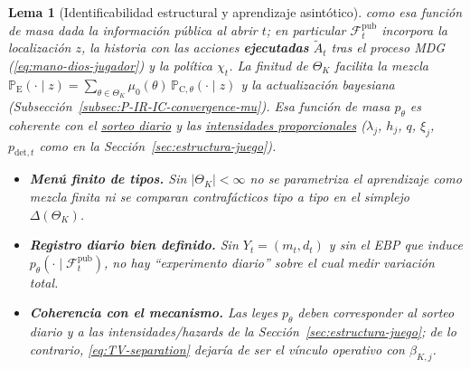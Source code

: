 \documentclass[12pt]{article}
\newenvironment{fnnote}{%
  \begin{minipage}[t]{\linewidth}%
  \sloppy
}{\end{minipage}}
\newtheorem{lemma}[theorem]{Lema}
\theoremstyle{definition}
\theoremstyle{remark}
\newcommand{\ProbE}{\mathbb{P}_{\mathrm{E}}}
\newcommand{\ProbC}[1]{\mathbb{P}_{\mathrm{C},#1}}
\newcommand{\1}{\mathbf{1}}
\begin{document}
\begin{lemma}[Identificabilidad estructural y aprendizaje asintótico]
{\begin{fnnote}
\end{fnnote}}
como esa función de masa dada la información pública al abrir $t$; en particular $\mathcal{F}_t^{\mathrm{pub}}$ incorpora la localización $z$, la historia con las acciones \textbf{ejecutadas} $\tilde{A}_t$ tras el \textit{proceso MDG} \textup{(}\eqref{eq:mano-dios-jugador}\textup{)} y la política $\chi_t$. La finitud de $\Theta_K$ facilita la mezcla $\ProbE(\cdot\mid z)=\sum_{\theta\in\Theta_K}\mu_0(\theta)\,\ProbC{\theta}(\cdot\mid z)$ y la actualización bayesiana \textup{(}Subsección~\ref{subsec:P-IR-IC-convergence-mu}\textup{)}. Esa función de masa $p_\theta$ es coherente con el \hyperref[subsec:discrete]{sorteo diario} y las \hyperref[subsec:intensidades-prop]{intensidades proporcionales} \textup{(}$\lambda_j$, $h_j$, $q$, $\xi_j$, $p_{\mathrm{det},t}$ como en la Sección~\ref{sec:estructura-juego}\textup{)}.
\begin{itemize}
  \setlength{\itemsep}{0.2em}%
  \setlength{\parsep}{0pt}%
  \item[\textup{(N1)}] \textbf{Menú finito de tipos.} Sin $\lvert\Theta_K\rvert<\infty$ no se parametriza el aprendizaje como mezcla finita ni se comparan contrafácticos tipo a tipo en el simplejo $\Delta(\Theta_K)$.
  \item[\textup{(N2)}] \textbf{Registro diario bien definido.} Sin $Y_t=(m_t,d_t)$ y sin el EBP que induce $p_\theta(\cdot\mid\mathcal{F}_t^{\mathrm{pub}})$, no hay ``experimento diario'' sobre el cual medir variación total.
  \item[\textup{(N3)}] \textbf{Coherencia con el mecanismo.} Las leyes $p_\theta$ deben corresponder al sorteo diario y a las intensidades/hazards de la Sección~\ref{sec:estructura-juego}; de lo contrario, \eqref{eq:TV-separation} dejaría de ser el vínculo operativo con $\beta_{K,j}$.
\end{itemize}


\end{lemma}
\end{document}
